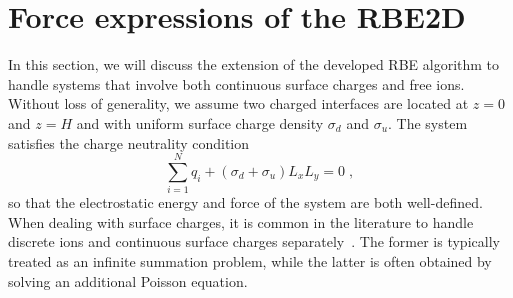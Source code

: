 

\section{Force expressions of the RBE2D}\label{app::surfacecharge}

In this section, we will discuss the extension of the developed RBE algorithm to handle systems that involve both continuous surface charges and free ions. Without loss of generality, we assume two charged interfaces are located at $z=0$ and $z=H$ and with uniform surface charge density $\sigma_d$ and $\sigma_u$. The system satisfies the charge neutrality condition \begin{equation}\label{eq::chargeneutrality}
    \sum_{i=1}^N q_i+(\sigma_d+\sigma_u)L_xL_y=0\;,
\end{equation}
so that the electrostatic energy and force of the system are both well-defined. When dealing with surface charges, it is common in the literature to handle discrete ions and continuous surface charges separately~\cite{spohr1997effect,yi2017note,yuan2021particle}. The former is typically treated as an infinite summation problem, while the latter is often obtained by solving an additional Poisson equation. %

